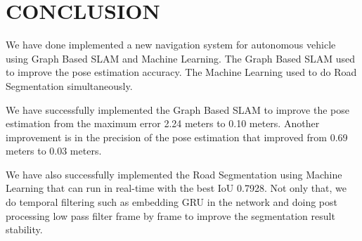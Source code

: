 \chapter{CONCLUSION}
\label{sec:chap5_tutup}
    We have done implemented a new navigation system for autonomous vehicle using Graph Based SLAM and Machine Learning. The Graph Based SLAM used to improve the pose estimation accuracy. The Machine Learning used to do Road Segmentation simultaneously. 
    \par    
    We have successfully implemented the Graph Based SLAM to improve the pose estimation from the maximum error 2.24 meters to 0.10 meters. Another improvement is in the precision of the pose estimation that improved from 0.69 meters to 0.03 meters. 
    \par   
    We have also successfully implemented the Road Segmentation using Machine Learning that can run in real-time with the best IoU 0.7928. Not only that, we do temporal filtering such as embedding GRU in the network and doing post processing low pass filter frame by frame to improve the segmentation result stability.
\section*{ }

